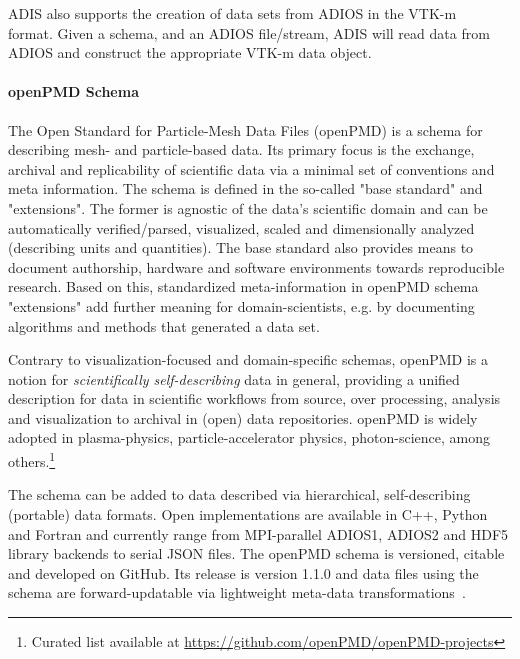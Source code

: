 \documentclass[x11names,table,xcdraw,graybox]{svmult}
\begin{document}
ADIS also supports the creation of data sets from ADIOS in the VTK-m~\cite{moreland2016} format. Given a schema, and an ADIOS file/stream, ADIS will read data from ADIOS and construct the appropriate VTK-m data object.

\paragraph{\textbf{openPMD Schema}}

The Open Standard for Particle-Mesh Data Files (openPMD) is a schema for describing mesh- and particle-based data.
Its primary focus is the exchange, archival and replicability of scientific data via a minimal set of conventions and meta information.
The schema is defined in the so-called "base standard" and "extensions".
The former is agnostic of the data's scientific domain and can be automatically verified/parsed, visualized, scaled and dimensionally analyzed (describing units and quantities).
The base standard also provides means to document authorship, hardware and software environments towards reproducible research.
Based on this, standardized meta-information in openPMD schema "extensions" add further meaning for domain-scientists, e.g. by documenting algorithms and methods that generated a data set.

Contrary to visualization-focused and domain-specific schemas, openPMD is a notion for \textit{scientifically self-describing} data in general, providing a unified description for data in scientific workflows from source, over processing, analysis and visualization to archival in (open) data repositories.
openPMD is widely adopted in plasma-physics, particle-accelerator physics, photon-science, among others.\footnote{Curated list available at \url{https://github.com/openPMD/openPMD-projects}}

The schema can be added to data described via hierarchical, self-describing (portable) data formats.
Open implementations are available in C++, Python and Fortran and currently range from MPI-parallel ADIOS1, ADIOS2 and HDF5 library backends to serial JSON files.
The openPMD schema is versioned, citable and developed on GitHub.
Its release is version 1.1.0 and data files using the schema are forward-updatable via lightweight meta-data transformations~\cite{HueblopenPMD}.
\end{document}
